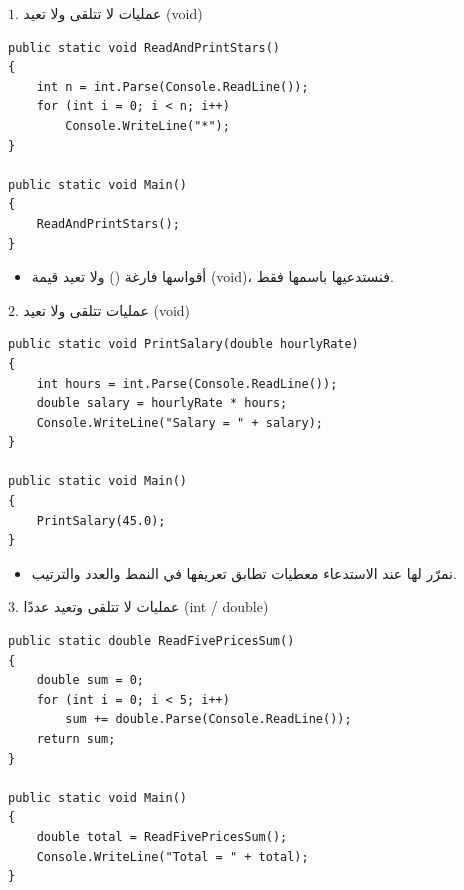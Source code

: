 \documentclass[13pt]{beamer}
\begin{document}
\begin{frame}[fragile]{$1$. عمليات لا تتلقى ولا تعيد (\textenglish{void})}
\begin{english}
\begin{lstlisting}[language=CSharp]
public static void ReadAndPrintStars()
{
    int n = int.Parse(Console.ReadLine());
    for (int i = 0; i < n; i++)
        Console.WriteLine("*");
}

public static void Main()
{
    ReadAndPrintStars();
}
\end{lstlisting}
\end{english}
\vspace{0.2em}
\begin{itemize}
  \item أقواسها فارغة \textenglish{()} ولا تعيد قيمة (\textenglish{void})، فنستدعيها باسمها فقط.
\end{itemize}
\end{frame}

\begin{frame}[fragile]{$2$. عمليات تتلقى ولا تعيد (\textenglish{void})}
\begin{english}
\begin{lstlisting}[language=CSharp]
public static void PrintSalary(double hourlyRate)
{
    int hours = int.Parse(Console.ReadLine());
    double salary = hourlyRate * hours;
    Console.WriteLine("Salary = " + salary);
}

public static void Main()
{
    PrintSalary(45.0);
}
\end{lstlisting}
\end{english}
\vspace{0.2em}
\begin{itemize}
  \item نمرّر لها عند الاستدعاء معطيات تطابق تعريفها في النمط والعدد والترتيب.
\end{itemize}
\end{frame}

\begin{frame}[fragile]{$3$. عمليات لا تتلقى وتعيد عددًا (\textenglish{int / double})}
\begin{english}
\begin{lstlisting}[language=CSharp]
public static double ReadFivePricesSum()
{
    double sum = 0;
    for (int i = 0; i < 5; i++)
        sum += double.Parse(Console.ReadLine());
    return sum;
}

public static void Main()
{
    double total = ReadFivePricesSum();
    Console.WriteLine("Total = " + total);
}
\end{lstlisting}
\end{english}
\end{frame}
\end{document}
